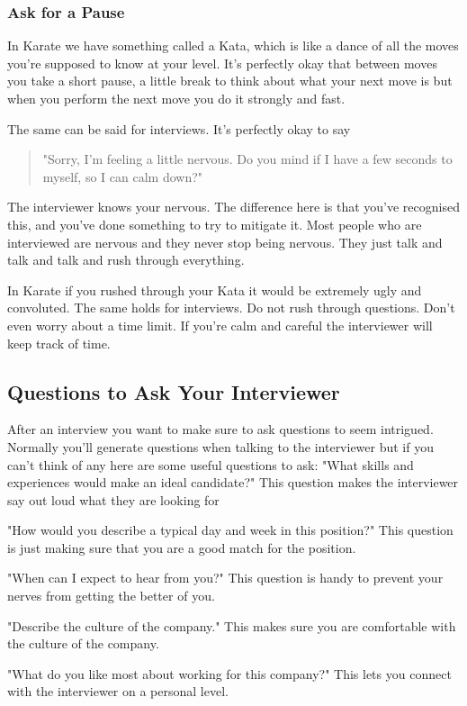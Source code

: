 \documentclass{article}
\begin{document}
\subsubsection{Ask for a Pause}
In Karate we have something called a Kata, which is like a dance of all
the moves you're supposed to know at your level. It's perfectly okay
that between moves you take a short pause, a little break to think about
what your next move is but when you perform the next move you do it
strongly and fast.

The same can be said for interviews. It's perfectly okay to say
\begin{quote}
    "Sorry, I'm feeling a little nervous. Do you mind if I have a few
seconds to myself, so I can calm down?"
\end{quote}
The interviewer knows your nervous. The difference here is that you've
recognised this, and you've done something to try to mitigate it. Most
people who are interviewed are nervous and they never stop being
nervous. They just talk and talk and talk and rush through everything.

In Karate if you rushed through your Kata it would be extremely ugly and
convoluted. The same holds for interviews. Do not rush through
questions. Don't even worry about a time limit. If you're calm and
careful the interviewer will keep track of time.
\subsection{Questions to Ask Your Interviewer}
After an interview you want to make sure to ask questions to seem
intrigued. Normally you'll generate questions when talking to the
interviewer but if you can't think of any here are some useful questions
to ask:
"What skills and experiences would make an ideal candidate?" This
question makes the interviewer say out loud what they are looking for

"How would you describe a typical day and week in this position?" This
question is just making sure that you are a good match for the position.

"When can I expect to hear from you?" This question is handy to
prevent your nerves from getting the better of you.

"Describe the culture of the company." This makes sure you are
comfortable with the culture of the company.

"What do you like most about working for this company?" This lets you
connect with the interviewer on a personal level.
\end{document}
